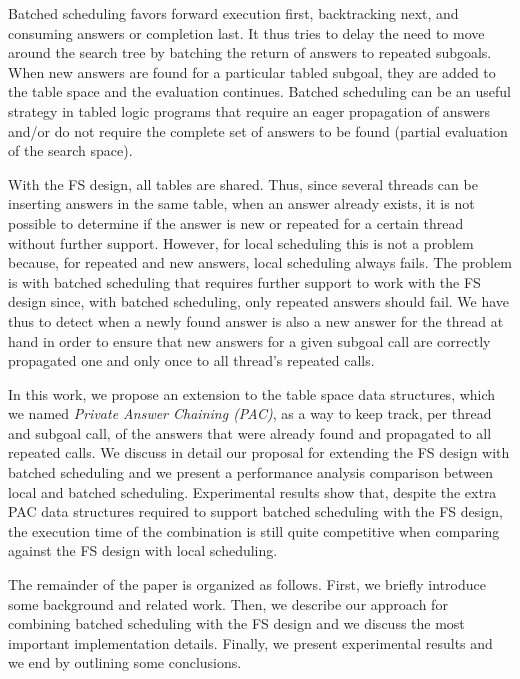 \documentclass{llncs}
\begin{document}
Batched scheduling favors forward execution first, backtracking next,
and consuming answers or completion last. It thus tries to delay the
need to move around the search tree by batching the return of answers
to repeated subgoals. When new answers are found for a particular
tabled subgoal, they are added to the table space and the evaluation
continues. Batched scheduling can be an useful strategy in tabled
logic programs that require an eager propagation of answers and/or do
not require the complete set of answers to be found (partial
evaluation of the search space).

With the FS design, all tables are shared. Thus, since several threads
can be inserting answers in the same table, when an answer already
exists, it is not possible to determine if the answer is new or
repeated for a certain thread without further support. However, for
local scheduling this is not a problem because, for repeated and new
answers, local scheduling always fails. The problem is with batched
scheduling that requires further support to work with the FS design
since, with batched scheduling, only repeated answers should fail. We
have thus to detect when a newly found answer is also a new answer for
the thread at hand in order to ensure that new answers for a given
subgoal call are correctly propagated one and only once to all
thread's repeated calls.
 
In this work, we propose an extension to the table space data
structures, which we named \emph{Private Answer Chaining (PAC)}, as a
way to keep track, per thread and subgoal call, of the answers that
were already found and propagated to all repeated calls. We discuss in
detail our proposal for extending the FS design with batched
scheduling and we present a performance analysis comparison between
local and batched scheduling. Experimental results show that, despite
the extra PAC data structures required to support batched scheduling
with the FS design, the execution time of the combination is still
quite competitive when comparing against the FS design with local
scheduling.

The remainder of the paper is organized as follows. First, we briefly
introduce some background and related work. Then, we describe our
approach for combining batched scheduling with the FS design and we
discuss the most important implementation details. Finally, we present
experimental results and we end by outlining some conclusions.

\end{document}
